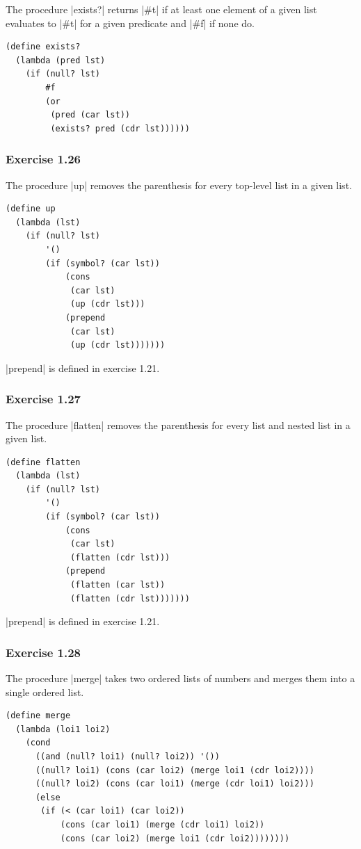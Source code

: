 \documentclass[a4paper]{article}
\begin{document}
The procedure |exists?| returns |#t| if at least one element of a given list evaluates to |#t| for a given predicate and |#f| if none do.

\begin{lstlisting}
(define exists?
  (lambda (pred lst)
    (if (null? lst)
        #f
        (or
         (pred (car lst))
         (exists? pred (cdr lst))))))
\end{lstlisting}

\subsubsection{Exercise 1.26}

The procedure |up| removes the parenthesis for every top-level list in a given list.

\begin{lstlisting}
(define up
  (lambda (lst)
    (if (null? lst)
        '()
        (if (symbol? (car lst))
            (cons
             (car lst)
             (up (cdr lst)))
            (prepend
             (car lst)
             (up (cdr lst)))))))
\end{lstlisting}

|prepend| is defined in exercise 1.21.

\subsubsection{Exercise 1.27}

The procedure |flatten| removes the parenthesis for every list and nested list in a given list.

\begin{lstlisting}
(define flatten
  (lambda (lst)
    (if (null? lst)
        '()
        (if (symbol? (car lst))
            (cons
             (car lst)
             (flatten (cdr lst)))
            (prepend
             (flatten (car lst))
             (flatten (cdr lst)))))))
\end{lstlisting}

|prepend| is defined in exercise 1.21.

\subsubsection{Exercise 1.28}

The procedure |merge| takes two ordered lists of numbers and merges them into a single ordered list.

\begin{lstlisting}
(define merge
  (lambda (loi1 loi2)
    (cond
      ((and (null? loi1) (null? loi2)) '())
      ((null? loi1) (cons (car loi2) (merge loi1 (cdr loi2))))
      ((null? loi2) (cons (car loi1) (merge (cdr loi1) loi2)))
      (else
       (if (< (car loi1) (car loi2))
           (cons (car loi1) (merge (cdr loi1) loi2))
           (cons (car loi2) (merge loi1 (cdr loi2))))))))
\end{lstlisting}
\end{document}
